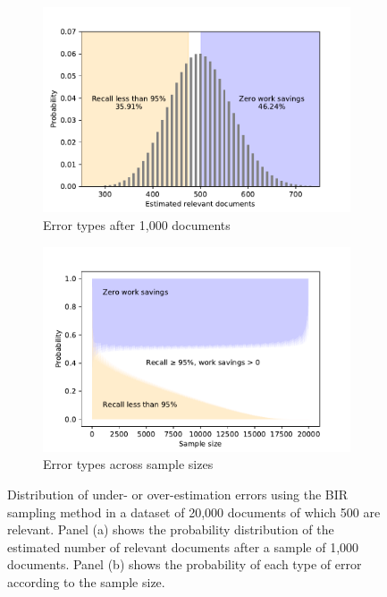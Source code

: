 \documentclass{bmcart}
\begin{document}
	\begin{figure}
	\centering
	\begin{subfigure}[b]{0.475\textwidth}   
		\centering 
		\includegraphics[width=\textwidth]{../images/bir_errors}
		\caption[]%
		{{\small Error types after 1,000 documents \\}}    
		\label{fig:bir_error}
	\end{subfigure}
	\hfill
	\begin{subfigure}[b]{0.475\textwidth}   
		\centering 
		\includegraphics[width=\textwidth]{../images/bir_error_distribution}
		\caption[]%
		{{\footnotesize Error types across sample sizes}}    
		\label{fig:bir_error_distribution}
	\end{subfigure}

	\caption{\small Distribution of under- or over-estimation errors using the BIR sampling method in a dataset of 20,000 documents of which 500 are relevant. Panel (a) shows the probability distribution of the estimated number of relevant documents after a sample of 1,000 documents. Panel (b) shows the probability of each type of error according to the sample size.} 
	\label{bir-sampling}
\end{figure}
\end{document}
